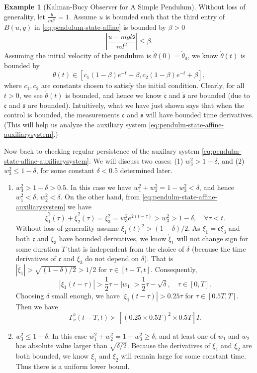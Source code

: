 \documentclass[
]{book}
\theoremstyle{definition}
\theoremstyle{definition}
\newtheorem{example}{Example}[chapter]
\theoremstyle{definition}
\theoremstyle{definition}
\theoremstyle{remark}
\begin{document}
\begin{example}[Kalman-Bucy Observer for A Simple Pendulum]
Without loss of generality, let \(\frac{b}{ml^2} = 1\). Assume \(u\) is bounded such that the third entry of \(B(u,y)\) in \eqref{eq:pendulum-state-affine} is bounded by \(\beta > 0\)
\[
\left| \frac{u - mgl \mathfrak{s}}{ml^2} \right| \leq \beta.
\]
Assuming the initial velocity of the pendulum is \(\dot{\theta}(0) = \dot{\theta}_0\), we know \(\dot{\theta}(t)\) is bounded by
\[
\dot{\theta}(t) \in \left[ c_1(1-\beta)e^{-t} - \beta  , c_2(1-\beta)e^{-t} + \beta \right],
\]
where \(c_1,c_2\) are constants chosen to satisfy the initial condition. Clearly, for all \(t > 0\), we see \(\dot{\theta}(t)\) is bounded, and hence we know \(\dot{\mathfrak{c}}\) and \(\dot{\mathfrak{s}}\) are bounded (due to \(\mathfrak{c}\) and \(\mathfrak{s}\) are bounded). Intuitively, what we have just shown says that when the control is bounded, the measurements \(\mathfrak{c}\) and \(\mathfrak{s}\) will have bounded time derivatives. (This will help us analyze the auxiliary system \eqref{eq:pendulm-state-affine-auxiliarysystem}.)

Now back to checking regular persistence of the auxilary system \eqref{eq:pendulm-state-affine-auxiliarysystem}. We will discuss two cases: (1) \(w_3^2 > 1 - \delta\), and (2) \(w_3^2 \leq 1 - \delta\), for some constant \(\delta < 0.5\) determined later.

\begin{enumerate}
\def\labelenumi{\arabic{enumi}.}
\item
  \(w_3^2 > 1 - \delta > 0.5\). In this case we have \(w_1^2 + w_2^2 = 1 - w_3^2 < \delta\), and hence \(w_1^2 < \delta\), \(w_2^2 < \delta\). On the other hand, from \eqref{eq:pendulm-state-affine-auxiliarysystem} we have
  \[
  \dot{\xi}_1^2(\tau) + \dot{\xi}_2^2(\tau) = \xi_3^2 = w_3^2 e^{2 (t - \tau)} > w_3^2 > 1 - \delta, \quad \forall \tau < t.
  \]
  Without loss of generality assume \(\dot{\xi}_1(t)^2 > (1-\delta)/2\). As \(\dot{\xi}_1 = \mathfrak{c} \xi_3\) and both \(\mathfrak{c}\) and \(\xi_3\) have bounded derivatives, we know \(\dot{\xi}_1\) will not change sign for some duration \(T\) that is independent from the choice of \(\delta\) (because the time derivatives of \(\mathfrak{c}\) and \(\xi_3\) do not depend on \(\delta\)). That is \(|\dot{\xi}_1| > \sqrt{(1-\delta)/2} > 1/2\) for \(\tau \in [t - T,t]\). Consequently,
  \[
  |\xi_1(t - \tau)| > \frac{1}{2} \tau - |w_1| > \frac{1}{2} \tau - \sqrt{\delta}, \quad \tau \in [0,T].
  \]
  Choosing \(\delta\) small enough, we have \(|\xi_1(t - \tau)| > 0.25 \tau\) for \(\tau \in [0.5T,T]\). Then we have
  \[
  \Gamma_\nu^b(t - T, t) \succ [(0.25 \times 0.5 T)^2 \times 0.5T]I.
  \]
\item
  \(w_3^2 \leq 1-\delta\). In this case \(w_1^2 + w_2^2 = 1 - w_3^2 \geq \delta\), and at least one of \(w_1\) and \(w_2\) has absolute value larger than \(\sqrt{\delta/2}\). Because the derivatives of \(\xi_1\) and \(\xi_2\) are both bounded, we know \(\xi_1\) and \(\xi_2\) will remain large for some constant time. Thus there is a uniform lower bound.
\end{enumerate}


\end{example}
\end{document}
